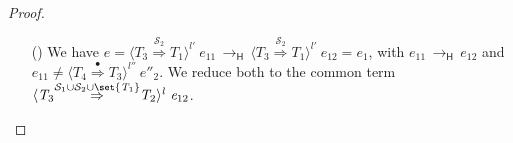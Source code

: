 \documentclass[9pt]{extarticle}
\newcommand{\ottnt}[1]{\mathit{#1}}
\begin{document}
{\begin{lemma}
\begin{proof}
{\begin{itemize}
    \item[(\E{CastInner})] We have $\ottnt{e} =  \langle  \ottnt{T_{{\mathrm{3}}}}  \mathord{ \overset{ \mathcal{S}_{{\mathrm{2}}} }{\Rightarrow} }  \ottnt{T_{{\mathrm{1}}}}  \rangle^{ \ottnt{l'} } ~  \ottnt{e_{{\mathrm{11}}}}  \,  \longrightarrow _{  \mathsf{H}  }  \,  \langle  \ottnt{T_{{\mathrm{3}}}}  \mathord{ \overset{ \mathcal{S}_{{\mathrm{2}}} }{\Rightarrow} }  \ottnt{T_{{\mathrm{1}}}}  \rangle^{ \ottnt{l'} } ~  \ottnt{e_{{\mathrm{12}}}}  = \ottnt{e_{{\mathrm{1}}}}$, with $\ottnt{e_{{\mathrm{11}}}} \,  \longrightarrow _{  \mathsf{H}  }  \, \ottnt{e_{{\mathrm{12}}}}$ and
      $\ottnt{e_{{\mathrm{11}}}}  \neq   \langle  \ottnt{T_{{\mathrm{4}}}}  \mathord{ \overset{\bullet}{\Rightarrow} }  \ottnt{T_{{\mathrm{3}}}}  \rangle^{ \ottnt{l''} } ~  \ottnt{e''_{{\mathrm{2}}}} $. We reduce both to the common
      term $ \langle  \ottnt{T_{{\mathrm{3}}}}  \mathord{ \overset{   \mathcal{S}_{{\mathrm{1}}}  \cup  \mathcal{S}_{{\mathrm{2}}}   \cup   \set{  \ottnt{T_{{\mathrm{1}}}}  }   }{\Rightarrow} }  \ottnt{T_{{\mathrm{2}}}}  \rangle^{ \ottnt{l} } ~  \ottnt{e_{{\mathrm{12}}}} $.


\end{itemize}}
\end{proof}
\end{lemma}}
\end{document}
